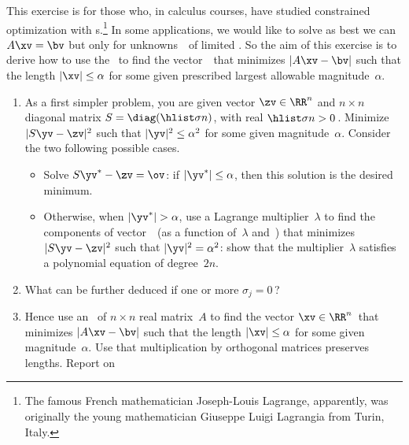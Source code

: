 \begin{exercise}  
This exercise is for those who, in calculus courses, have studied constrained optimization with s.\footnote{The famous French mathematician Joseph-Louis Lagrange, apparently, was originally the young mathematician Giuseppe Luigi Lagrangia from Turin, Italy.}
In some applications, we would like to solve as best we can \(A\xv=\bv\) but only for unknowns~\xv\ of limited .
So the aim of this exercise is to derive how to use the \svd\ to find the vector~\xv\ that minimizes \(|A\xv-\bv|\) such that the length \(|\xv|\leq\alpha\) for some given prescribed largest allowable magnitude~\(\alpha\).
\begin{enumerate}
\item As a first simpler problem, you are given vector \(\zv\in\RR^n\) and \(n\times n\) diagonal matrix \(S=\diag(\hlist\sigma n)\), with real \(\hlist\sigma n>0\)\,.
Minimize \(|S\yv-\zv|^2\) such that \(|\yv|^2\leq\alpha^2\) for some given magnitude~\(\alpha\).
Consider the two following possible cases.
\begin{itemize}
\item Solve \(S\yv^*-\zv=\ov\): if \(|\yv^*|\leq\alpha\), then this solution is the desired minimum.
\item Otherwise, when \(|\yv^*|>\alpha\), use a Lagrange multiplier~\(\lambda\) to find the components of vector~\yv\ (as a function of~\(\lambda\) and~\zv) that minimizes \(|S\yv-\zv|^2\) such that \(|\yv|^2=\alpha^2\):  show that the multiplier~\(\lambda\) satisfies a polynomial equation of degree~\(2n\).
\end{itemize}

\item What can be further deduced if one or more \(\sigma_j=0\)\,?

\item Hence use an \svd\ of \(n\times n\) real matrix~\(A\) to find the vector \(\xv\in\RR^n\)\ that minimizes \(|A\xv-\bv|\) such that the length \(|\xv|\leq\alpha\) for some given magnitude~\(\alpha\).
Use that multiplication by orthogonal matrices preserves lengths.
Report on 
\end{enumerate}
\end{exercise}







